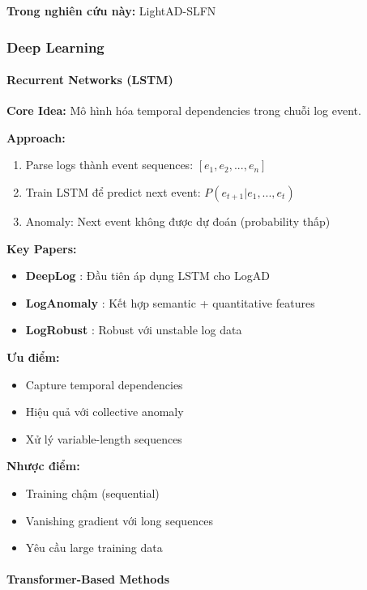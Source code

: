 \textbf{Trong nghiên cứu này:} LightAD-SLFN

\subsubsection{Deep Learning}

\paragraph{Recurrent Networks (LSTM)}

\textbf{Core Idea:} Mô hình hóa temporal dependencies trong chuỗi log event.

\textbf{Approach:}
\begin{enumerate}
    \item Parse logs thành event sequences: $[e_1, e_2, ..., e_n]$
    \item Train LSTM để predict next event: $P(e_{t+1} | e_1, ..., e_t)$
    \item Anomaly: Next event không được dự đoán (probability thấp)
\end{enumerate}

\textbf{Key Papers:}
\begin{itemize}
    \item \textbf{DeepLog} \cite{du2017deeplog}: Đầu tiên áp dụng LSTM cho LogAD
    \item \textbf{LogAnomaly} \cite{meng2019loganomaly}: Kết hợp semantic + quantitative features
    \item \textbf{LogRobust} \cite{zhang2019logrobust}: Robust với unstable log data
\end{itemize}

\textbf{Ưu điểm:}
\begin{itemize}
    \item Capture temporal dependencies
    \item Hiệu quả với collective anomaly
    \item Xử lý variable-length sequences
\end{itemize}

\textbf{Nhược điểm:}
\begin{itemize}
    \item Training chậm (sequential)
    \item Vanishing gradient với long sequences
    \item Yêu cầu large training data
\end{itemize}

\paragraph{Transformer-Based Methods}

